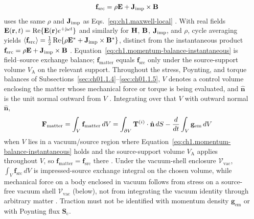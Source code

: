 \begin{equation}
\label{eq:ch1.maxwell-source-force}
\mathbf{f}_{\mathrm{src}}=\rho\mathbf{E}+\mathbf{J}_{\mathrm{imp}}\times\mathbf{B}
\end{equation}
uses the same $\rho$ and $\mathbf{J}_{\mathrm{imp}}$ as Eqs.~\eqref{eq:ch1.maxwell-local} \cite{maxwell1873,jackson1999}. With real fields $\mathbf{E}(\mathbf{r},t)=\Re\{\mathbf{E}(\mathbf{r})e^{+\mathrm{j}\omega t}\}$ and similarly for $\mathbf{H}$, $\mathbf{B}$, $\mathbf{J}_{\mathrm{imp}}$, and $\rho$, cycle averaging yields
$\langle\mathbf{f}_{\mathrm{src}}\rangle=\tfrac12\Re\{\rho\mathbf{E}^*+\mathbf{J}_{\mathrm{imp}}\times\mathbf{B}^*\}$,
distinct from the instantaneous product $\mathbf{f}_{\mathrm{src}}=\rho\mathbf{E}+\mathbf{J}_{\mathrm{imp}}\times\mathbf{B}$ \cite{stratton1941}. Equation~\eqref{eq:ch1.momentum-balance-instantaneous} is field--source exchange balance; $\mathbf{f}_{\mathrm{matter}}$ equals $\mathbf{f}_{\mathrm{src}}$ only under the source-support volume $V_{\mathrm{A}}$ on the relevant support.
Throughout the stress, Poynting, and torque balances of
Subsections~\ref{sec:ch01.1.4}--\ref{sec:ch01.1.5}, $V$ denotes a control volume
enclosing the matter whose mechanical force or torque is being evaluated, and
$\hat{\mathbf{n}}$ is the unit normal outward from $V$ \cite{stratton1941}.
Integrating over that $V$ with outward normal $\hat{\mathbf{n}}$,
\begin{equation}
\label{eq:ch1.momentum-integral-balance}
\mathbf{F}_{\mathrm{matter}}
=\int_V \mathbf{f}_{\mathrm{matter}}\,dV
=\int_{\partial V}\mathbf{T}^{(i)}\cdot\hat{\mathbf{n}}\,dS
-\frac{d}{dt}\int_V \mathbf{g}_{\mathrm{em}}\,dV
\end{equation}
when $V$ lies in a vacuum/source region where Equation~\eqref{eq:ch1.momentum-balance-instantaneous} holds and the source-support volume $V_{\mathrm{A}}$ applies throughout $V$, so $\mathbf{f}_{\mathrm{matter}}=\mathbf{f}_{\mathrm{src}}$ there \cite{stratton1941}. Under the vacuum-shell enclosure $\mathcal{V}_{\mathrm{vac}}$, $\int_V \mathbf{f}_{\mathrm{src}}\,dV$ is impressed-source exchange integral on the chosen volume, while mechanical force on a body enclosed in vacuum follows from stress on a source-free vacuum shell $\mathcal{V}_{\mathrm{vac}}$ (below), not from integrating the vacuum identity through arbitrary matter \cite{stratton1941,harrington2001}. Traction must not be identified with momentum density $\mathbf{g}_{\mathrm{em}}$ or with Poynting flux $\mathbf{S}_\mathrm{c}$.

